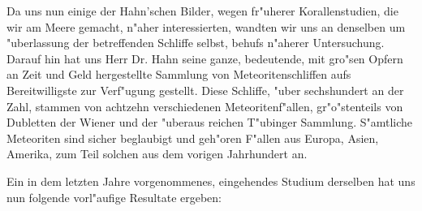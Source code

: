 \documentclass[a4paper, 11pt, oneside]{article}
\begin{document}
Da uns nun einige der Hahn'schen Bilder, wegen fr"uherer Korallenstudien, die wir am Meere gemacht, n"aher interessierten, wandten wir uns an denselben um "uberlassung der betreffenden Schliffe selbst, behufs n"aherer Untersuchung. Darauf hin hat uns Herr Dr. Hahn seine ganze, bedeutende, mit gro"sen Opfern an Zeit und Geld hergestellte Sammlung von Meteoritenschliffen aufs Bereitwilligste zur Verf"ugung gestellt. Diese Schliffe, "uber sechshundert an der Zahl, stammen von achtzehn verschiedenen Meteoritenf"allen, gr"o"stenteils von Dubletten der Wiener und der "uberaus reichen T"ubinger Sammlung. S"amtliche Meteoriten sind sicher beglaubigt und geh"oren F"allen aus Europa, Asien, Amerika, zum Teil solchen aus dem vorigen Jahrhundert an.

Ein in dem letzten Jahre vorgenommenes, eingehendes Studium derselben hat uns nun folgende vorl"aufige Resultate ergeben:
\end{document}
